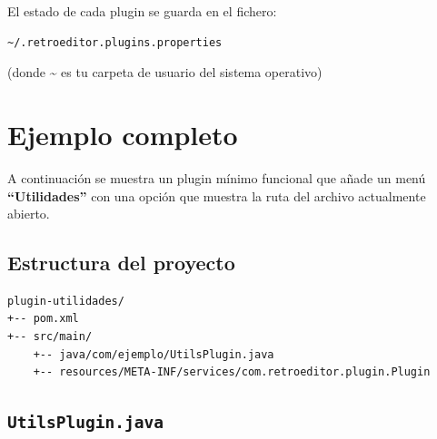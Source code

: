 \documentclass[../../main.tex]{subfiles}
\begin{document}
El estado de cada plugin se guarda en el fichero:

\begin{lstlisting}
~/.retroeditor.plugins.properties
\end{lstlisting}

(donde \textasciitilde{} es tu carpeta de usuario del sistema operativo)

\clearpage

\section{Ejemplo completo}

A continuación se muestra un plugin mínimo funcional que añade un menú \textbf{``Utilidades''} con una opción que muestra la ruta del archivo actualmente abierto.

\subsection{Estructura del proyecto}

\begin{lstlisting}[language=bash]
plugin-utilidades/
+-- pom.xml
+-- src/main/
    +-- java/com/ejemplo/UtilsPlugin.java
    +-- resources/META-INF/services/com.retroeditor.plugin.Plugin
\end{lstlisting}

\subsection{\lstinline|UtilsPlugin.java|}
\end{document}
